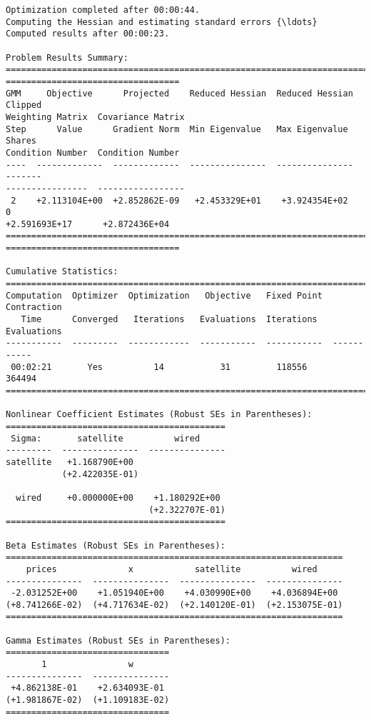 \begin{Verbatim}[commandchars=\\\{\}]
Optimization completed after 00:00:44.
Computing the Hessian and estimating standard errors {\ldots}
Computed results after 00:00:23.

Problem Results Summary:
================================================================================
==================================
GMM     Objective      Projected    Reduced Hessian  Reduced Hessian  Clipped
Weighting Matrix  Covariance Matrix
Step      Value      Gradient Norm  Min Eigenvalue   Max Eigenvalue   Shares
Condition Number  Condition Number
----  -------------  -------------  ---------------  ---------------  -------
----------------  -----------------
 2    +2.113104E+00  +2.852862E-09   +2.453329E+01    +3.924354E+02      0
+2.591693E+17      +2.872436E+04
================================================================================
==================================

Cumulative Statistics:
===========================================================================
Computation  Optimizer  Optimization   Objective   Fixed Point  Contraction
   Time      Converged   Iterations   Evaluations  Iterations   Evaluations
-----------  ---------  ------------  -----------  -----------  -----------
 00:02:21       Yes          14           31         118556       364494
===========================================================================

Nonlinear Coefficient Estimates (Robust SEs in Parentheses):
===========================================
 Sigma:       satellite          wired
---------  ---------------  ---------------
satellite   +1.168790E+00
           (+2.422035E-01)

  wired     +0.000000E+00    +1.180292E+00
                            (+2.322707E-01)
===========================================

Beta Estimates (Robust SEs in Parentheses):
==================================================================
    prices              x            satellite          wired
---------------  ---------------  ---------------  ---------------
 -2.031252E+00    +1.051940E+00    +4.030990E+00    +4.036894E+00
(+8.741266E-02)  (+4.717634E-02)  (+2.140120E-01)  (+2.153075E-01)
==================================================================

Gamma Estimates (Robust SEs in Parentheses):
================================
       1                w
---------------  ---------------
 +4.862138E-01    +2.634093E-01
(+1.981867E-02)  (+1.109183E-02)
================================
    \end{Verbatim}

